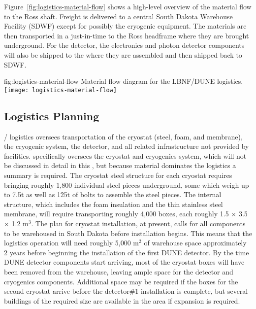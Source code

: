 Figure~\ref{fig:logistics-material-flow} shows a high-level overview of the material flow to the Ross shaft. Freight is delivered to a central South Dakota Warehouse Facility (SDWF)  except for possibly the cryogenic equipment. 
 The materials are then transported in a just-in-time to the Ross headframe where they are brought underground. For the detector, the  electronics and photon detector components will also be shipped to the  where they are assembled and then shipped back to SDWF.
 
\begin{dunefigure}{fig:logistics-material-flow}
  {Material flow diagram for the LBNF/DUNE logistics.}
 \texttt{[image: logistics-material-flow]}
\end{dunefigure}


\subsection{Logistics Planning}
\label{sec:fdsp-tc-logPln}
/ logistics oversees transportation of the cryostat (steel, foam, and membrane), the cryogenic system, the detector, and all related infrastructure not provided by facilities.  specifically oversees the cryostat and cryogenics system, which will not be discussed in detail in this , but because  material dominates the logistics a summary is required. The cryostat steel structure for each cryostat requires bringing roughly 1,800 individual steel pieces underground, some which weigh up to 7.5t as well as 125t of bolts to assemble the steel pieces. The internal structure, which includes the foam insulation and the thin stainless steel membrane, will require transporting roughly 4,000 boxes, each roughly 1.5 $\times$ 3.5 $\times$ 1.2 m$^3$. The plan for cryostat installation, at present, calls for all components to be warehoused in South Dakota before installation begins. This means that the logistics operation will need roughly 5,000 m$^2$ of warehouse space approximately 2 years before beginning the installation of the first DUNE detector. By the time DUNE detector components start arriving, most of the cryostat boxes will have been removed from the warehouse, leaving ample space for the detector and cryogenics components. Additional space may be required if the boxes for the second cryostat arrive before the detector\#1 installation is complete, but several buildings of the required size are available in the area if expansion is required.


